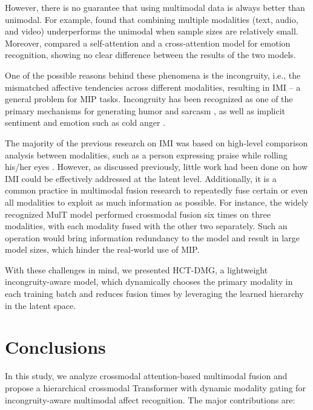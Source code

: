 \documentclass[11pt,a4paper]{article}
\begin{document}
However, there is no guarantee that using multimodal data is always better than unimodal. For example, \citet{huang2021makes} found that combining multiple modalities (text, audio, and video) underperforms the unimodal when sample sizes are relatively small. Moreover, \citet{rajan2022cross} compared a self-attention and a cross-attention model for emotion recognition, showing no clear difference between the results of the two models.

One of the possible reasons behind these phenomena is the incongruity, i.e., the mismatched affective tendencies across different modalities, resulting in IMI -- a general problem for MIP tasks. Incongruity has been recognized as one of the primary mechanisms for generating humor and sarcasm \citep{stock2003getting}, as well as implicit sentiment and emotion such as cold anger \citep{yacoub2003recognition}. 

The majority of the previous research on IMI was based on high-level comparison analysis between modalities, such as a person expressing praise while rolling his/her eyes \citep{Wu2021}. However, as discussed previously, little work had been done on how IMI could be effectively addressed at the latent level. 
Additionally, it is a common practice in multimodal fusion research to repeatedly fuse certain or even all modalities to exploit as much information as possible. For instance, the widely recognized MulT model \citep{Tsai2019} performed crossmodal fusion six times on three modalities, with each modality fused with the other two separately. Such an operation would bring information redundancy to the model and result in large model sizes, which hinder the real-world use of MIP.

With these challenges in mind, we presented HCT-DMG, a lightweight incongruity-aware model, which dynamically chooses the primary modality in each training batch and reduces fusion times by leveraging the learned hierarchy in the latent space.

\section{Conclusions}
In this study, we analyze crossmodal attention-based multimodal fusion and propose a hierarchical crossmodal Transformer with dynamic modality gating for incongruity-aware multimodal affect recognition. The major contributions are:
\end{document}
